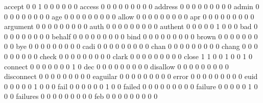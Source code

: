 \documentclass[compress,8pt]{beamer}
\begin{document}
\begin{frame}
\begin{Schunk}
  accept                                     0   0   1   0   0   0   0   0   0
  access                                     0   0   0   0   0   0   0   0   0
  address                                    0   0   0   0   0   0   0   0   0
  admin                                      0   0   0   0   0   0   0   0   0
  age                                        0   0   0   0   0   0   0   0   0
  allow                                      0   0   0   0   0   0   0   0   0
  apr                                        0   0   0   0   0   0   0   0   0
  argument                                   0   0   0   0   0   0   0   0   0
  auth                                       0   0   0   0   0   0   0   0   0
  authent                                    0   0   0   0   0   1   0   0   0
  bad                                        0   0   0   0   0   0   0   0   0
  behalf                                     0   0   0   0   0   0   0   0   0
  bind                                       0   0   0   0   0   0   0   0   0
  brown                                      0   0   0   0   0   0   0   0   0
  bye                                        0   0   0   0   0   0   0   0   0
  cadi                                       0   0   0   0   0   0   0   0   0
  chan                                       0   0   0   0   0   0   0   0   0
  chang                                      0   0   0   0   0   0   0   0   0
  check                                      0   0   0   0   0   0   0   0   0
  clark                                      0   0   0   0   0   0   0   0   0
  close                                      1   1   0   0   1   0   0   1   0
  connect                                    0   0   0   0   0   0   0   1   0
  dec                                        0   0   0   0   0   0   0   0   0
  disallow                                   0   0   0   0   0   0   0   0   0
  disconnect                                 0   0   0   0   0   0   0   0   0
  eaguilar                                   0   0   0   0   0   0   0   0   0
  error                                      0   0   0   0   0   0   0   0   0
  euid                                       0   0   0   0   0   1   0   0   0
  fail                                       0   0   0   0   0   0   1   0   0
  failed                                     0   0   0   0   0   0   0   0   0
  failure                                    0   0   0   0   0   1   0   0   0
  failures                                   0   0   0   0   0   0   0   0   0
  feb                                        0   0   0   0   0   0   0   0   0

\end{Schunk}
\end{frame}
\end{document}
